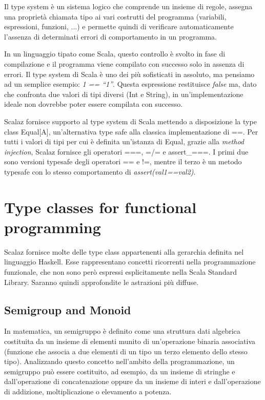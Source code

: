 Il type system è un sistema logico che comprende un insieme di regole, assegna una proprietà chiamata tipo ai vari costrutti del programma (variabili, espressioni, funzioni, ...) e permette quindi di verificare automaticamente l'assenza di determinati errori di comportamento in un programma.

In un linguaggio tipato come Scala, questo controllo è svolto in fase di compilazione e il programma viene compilato con successo solo in assenza di errori. Il type system di Scala è uno dei più sofisticati in assoluto, ma pensiamo ad un semplice esempio: \textit{1 == ``1''}. Questa espressione restituisce \textit{false} ma, dato che confronta due valori di tipi diversi (Int e String), in un'implementazione ideale non dovrebbe poter essere compilata con successo.

Scalaz fornisce supporto al type system di Scala mettendo a disposizione la type class Equal[A], un'alternativa type safe alla classica implementazione di ==. Per tutti i valori di tipi per cui è definita un'istanza di Equal, grazie alla \textit{method injection}, Scalaz fornisce gli operatori ===, =/= e assert\_===. I primi due sono versioni typesafe degli operatori == e !=, mentre il terzo è un metodo typesafe con lo stesso comportamento di \textit{assert(val1==val2)}.




\section{Type classes for functional programming}

Scalaz fornisce molte delle type class appartenenti alla gerarchia definita nel linguaggio Haskell. Esse rappresentano concetti ricorrenti nella programmazione funzionale, che non sono però espressi esplicitamente nella Scala Standard Library. Saranno quindi approfondite le astrazioni più diffuse.

\subsection{Semigroup and Monoid}

In matematica, un semigruppo è definito come una struttura dati algebrica costituita da un insieme di elementi munito di un'operazione binaria associativa (funzione che associa a due elementi di un tipo un terzo elemento dello stesso tipo). Analizzando questo concetto nell'ambito della programmazione, un semigruppo può essere costituito, ad esempio, da un insieme di stringhe e dall'operazione di concatenazione oppure da un insieme di interi e dall'operazione di addizione, moltiplicazione o elevamento a potenza.

